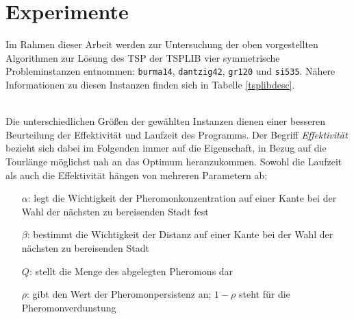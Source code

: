 \documentclass[doktyp=barbeit, sprache=german]{TUBAFarbeiten}
\begin{document}
\newpage\section{Experimente}
\label{sec:vorgehensweise}
Im Rahmen dieser Arbeit werden zur Untersuchung der oben vorgestellten Algorithmen zur Lösung des TSP der TSPLIB vier symmetrische Probleminstanzen entnommen: \texttt{burma14}, \texttt{dantzig42}, \texttt{gr120} und \texttt{si535}. Nähere Informationen zu diesen Instanzen finden sich in Tabelle \ref{tsplibdesc}.
\begin{table}[]
\centering
{}
\caption{Übersicht über die untersuchten TSPLIB-Instanzen mit den Angaben zur Anzahl der Städte, zum Tourlängenoptimum und zur Art des Problems}
\label{tsplibdesc}
\end{table}
\\Die unterschiedlichen Größen der gewählten Instanzen dienen einer besseren Beurteilung der Effektivität und Laufzeit des Programms.
Der Begriff \textit{Effektivität} bezieht sich dabei im Folgenden immer auf die Eigenschaft, in Bezug auf die Tourlänge möglichst nah an das Optimum heranzukommen. Sowohl die Laufzeit als auch die Effektivität hängen von mehreren Parametern ab:
\begin{itemize}
\item[$\alpha$:] legt die Wichtigkeit der Pheromonkonzentration auf einer Kante bei der Wahl der nächsten zu bereisenden Stadt fest
\item[$\beta$:] bestimmt die Wichtigkeit der Distanz auf einer Kante bei der Wahl der nächsten zu bereisenden Stadt 
\item[$Q$:] stellt die Menge des abgelegten Pheromons dar
\item[$\rho$:] gibt den Wert der Pheromonpersistenz an; $1 - \rho$ steht für die Pheromonverdunstung
\end{itemize}
\end{document}

